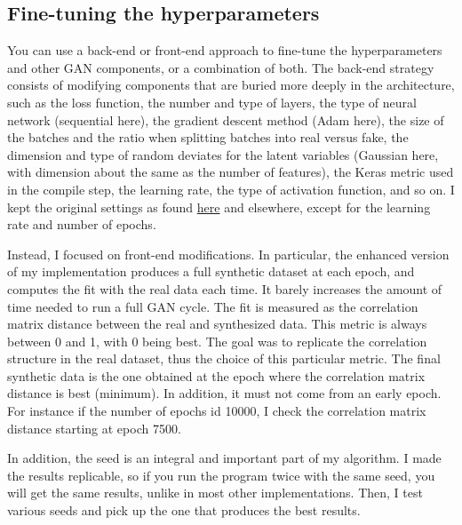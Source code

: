 \documentclass[oneside,10pt]{book}
\begin{document}
\subsection{Fine-tuning the hyperparameters}

You can use a back-end or front-end approach to fine-tune the hyperparameters and other GAN components, or a combination of both. The back-end strategy consists of
 modifying components that are buried more deeply in the architecture, such as the loss function, the number and type of layers,
the type of neural network (sequential here), the gradient descent method (Adam here), the size of the batches and the ratio when splitting batches into real versus fake, the dimension and type of random deviates for the latent variables (Gaussian here, with dimension about the same as the number of features), 
the Keras metric used in the compile step, the learning rate, the type of activation function, and so on. I kept the original settings 
 as found \href{https://towardsdatascience.com/hands-on-generative-adversarial-networks-gan-for-signal-processing-with-python-ff5b8d78bd28}{here} and elsewhere, except for the learning rate and number of epochs.

Instead, I focused on front-end modifications. In particular, the enhanced version of my implementation produces a full synthetic
 dataset at each epoch, and computes the fit with the real data each time. It barely increases the amount of time needed to run a full GAN cycle.
The fit is measured as the correlation matrix distance between the
 real and synthesized data. This
 metric is always between 0 and 1, with 0 being best. The goal was to replicate the correlation structure in the real dataset, thus the choice of this particular metric.  The final synthetic data is the one obtained at the epoch where the correlation matrix distance is best (minimum).
In addition, it must not come from an early epoch. For instance if the number of epochs id \num{10000}, I check the
correlation matrix distance starting at epoch 7500.
 

In addition,  the \textcolor{index}{seed} is an integral and important part of my algorithm. I made the 
results replicable, so if you run the program twice with the same seed, you will get the same results, unlike in most other
 implementations.  Then, I test various seeds and pick up the one that produces the best results.

              
\end{document}
